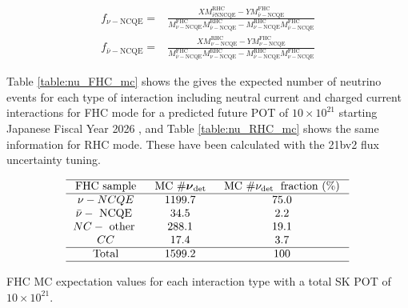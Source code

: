 \begin{equation}
    \begin{aligned}
    f_{\nu-\mathrm{NCQE}}= & \frac{X M_{\bar{\nu} \mathrm{N} \mathrm{NCQE}}^{\mathrm{RHC}}-Y M_{\bar{\nu}-\mathrm{NCQE}}^{\mathrm{FHC}}}{M_{\nu-\mathrm{NCQE}}^{\mathrm{FHC}} M_{\bar{\nu}-\mathrm{NCQE}}^{\mathrm{RHC}}-M_{\nu-\mathrm{NCQE}}^{\mathrm{RHC}} M_{\bar{\nu}-\mathrm{NCQE}}^{\mathrm{FHC}}} \\
    f_{\bar{\nu}-\mathrm{NCQE}}= & \frac{X M_{\nu-\mathrm{NCQE}}^{\mathrm{RHC}}-Y M_{\nu-\mathrm{NCQE}}^{\mathrm{FHC}}}{M_{\bar{\nu}-\mathrm{NCQE}}^{\mathrm{FHC}} M_{\nu-\mathrm{NCQE}}^{\mathrm{RHC}}-M_{\bar{\nu}-\mathrm{NCQE}}^{\mathrm{RHC}} M_{\nu-\mathrm{NCQE}}^{\mathrm{FHC}}}
    \end{aligned}
\label{eq:scale_factor_nu}
\end{equation}


Table \ref{table:nu_FHC_mc} shows the gives the expected number of neutrino events for each type of interaction including neutral current and charged current interactions for FHC mode for a predicted future POT of $10 \times 10^{21}$ starting Japanese Fiscal Year 2026 \cite{Abe:2016tii}, and Table \ref{table:nu_RHC_mc} shows the same information for RHC mode. These have been calculated with the 21bv2 flux uncertainty tuning. 


\begin{table}
    $$
    \begin{array}{ccc}
    \hline \text { FHC sample } & \text { MC } \# \boldsymbol{\nu}_{\text {det }} & \text { MC } \# \nu_{\text {det }} \text { fraction (\%) } \\
    \hline \nu-N C Q E & 1199.7 & 75.0 \\
    \bar{\nu}-\text { NCQE } & 34.5 & 2.2 \\
    N C-\text { other } & 288.1 & 19.1 \\
    C C & 17.4 & 3.7\\
    \hline \text { Total } & 1599.2 & 100 \\
    \hline
    \end{array}
    $$
    \caption{FHC MC expectation values for each interaction type with a total SK POT of $10 \times 10^{21}$. }
    \label{table:nu_FHC_mc}
\end{table}


